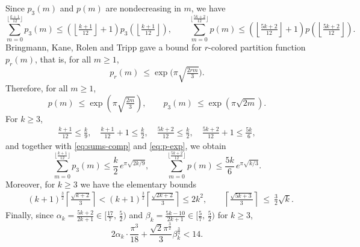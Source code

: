 \documentclass[12pt]{article}
\numberwithin{equation}{section}
\begin{document}
Since $p_3(m)$ and $p(m)$ are nondecreasing in $m$, we have
\begin{equation}\label{eq:sums-comp}
\sum_{m=0}^{\lfloor\frac{k+1}{12}\rfloor}p_3(m)\le \left(\left\lfloor\tfrac{k+1}{12}\right\rfloor+1\right)
p_3(\left\lfloor\tfrac{k+1}{12}\right\rfloor),\qquad
\sum_{m=0}^{\lfloor\frac{5k+2}{12}\rfloor}p(m)\le \left(\left\lfloor\tfrac{5k+2}{12}\right\rfloor+1\right)
p(\left\lfloor\tfrac{5k+2}{12}\right\rfloor).
\end{equation}
Bringmann, Kane, Rolen and Tripp \cite[P. 626]{Bringmann-Kane-Rolen-Tripp-2021} gave a bound for $r$-colored partition function $p_r(m)$, that is, for all $m\ge1$,
\begin{equation*}
p_r(m)\ \le \exp\Big(\pi\sqrt{\tfrac{2rm}{3}}\Big).
\end{equation*}
Therefore, for all $m\ge1$,
\begin{equation}\label{eq:p-exp}
p(m)\ \le \exp\left(\pi\sqrt{\tfrac{2m}{3}}\right),\qquad
p_3(m)\ \le \exp\left(\pi\sqrt{2m}\right).
\end{equation}
For $k\ge3$,
\begin{align*}
\frac{k+1}{12}\leq \frac{k}{9},\quad \frac{k+1}{12}+1\leq \frac{k}{2},
\quad \frac{5k+2}{12}\leq \frac{k}{2},\quad \frac{5k+2}{12}+1\leq \frac{5k}{6},
\end{align*}
and together with \eqref{eq:sums-comp} and \eqref{eq:p-exp}, we obtain
\begin{equation}\label{eq:alg1}
\sum_{m=0}^{\lfloor\frac{k+1}{12}\rfloor}p_3(m) \le \frac{k}2\, e^{\pi\sqrt{2k/9}},\qquad
\sum_{m=0}^{\lfloor\frac{5k+2}{12}\rfloor}p(m)
\le \frac{5k}{6}\, e^{\pi\sqrt{k/3}}.
\end{equation}
Moreover, for $k\ge3$ we have the elementary bounds
\begin{align}
&\left(k+1\right)^{\frac32}
\left\lceil\frac{\sqrt{k +2}}{3}\right\rceil<\left(k+1\right)^{\frac32}
\left\lceil\frac{\sqrt{2k +2}}{3}\right\rceil\leq2k^2,\qquad
\left\lceil\frac{\sqrt{5k+3}}{3}\right\rceil\ \le\ \frac{3}{2}\sqrt{k}.
\end{align}
Finally, since $\alpha_k=\frac{5k+2}{2k+1}\in\big[\frac{17}{7},\,\frac52\big)$ and
$\beta_k=\frac{5k-10}{2k+1}\in\big[\frac{5}{7},\,\frac52\big)$ for $k\ge3$,
\begin{equation}\label{eq:alphabeta-bdd}
2\alpha_k\cdot\frac{\pi^3}{18}
+\frac{\sqrt{2}\pi^{\frac{3}{2}}}{3} \beta_k^{\frac{3}{4}}< 14.
\end{equation}
\end{document}
